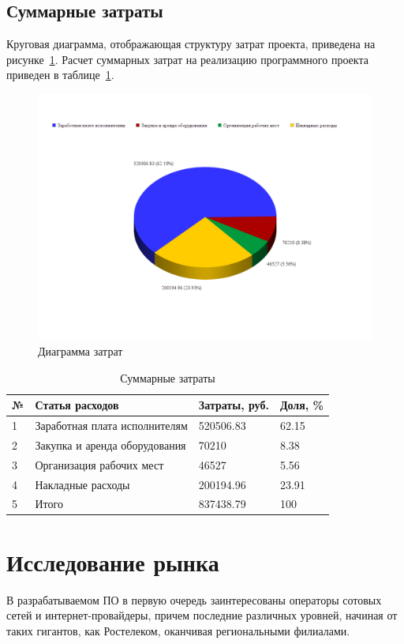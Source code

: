 \subsection{Суммарные затраты}
Круговая диаграмма, отображающая структуру затрат проекта, приведена на рисунке~\ref{fig:circle_diagram}. Расчет суммарных затрат на реализацию программного проекта приведен в таблице~\ref{table:all_expenses}.

\begin{figure}
\centering
\includegraphics[scale=0.4]{pictures/circle_diagram}
\caption{Диаграмма затрат}
\label{fig:circle_diagram}
\end{figure}

\begin{table}
\caption{Суммарные затраты}
\label{table:all_expenses}
\begin{tabular} {| l | l | l | l |} 
\hline
№ & Статья расходов & Затраты, руб. & Доля, \%\\
\hline
1 &  Заработная плата исполнителям & 520506.83 & 62.15\\
\hline
2 & Закупка и аренда оборудования & 70210 & 8.38\\
\hline
3 & Организация рабочих мест & 46527 & 5.56\\
\hline
4 & Накладные расходы & 200194.96 & 23.91\\
\hline
5 & Итого & 837438.79 & 100\\
\hline
\end{tabular}
\end{table}


\section{Исследование рынка}
В разрабатываемом ПО в первую очередь заинтересованы операторы сотовых сетей и интернет-провайдеры, причем последние различных уровней, начиная от таких гигантов, как Ростелеком, оканчивая региональными филиалами.

